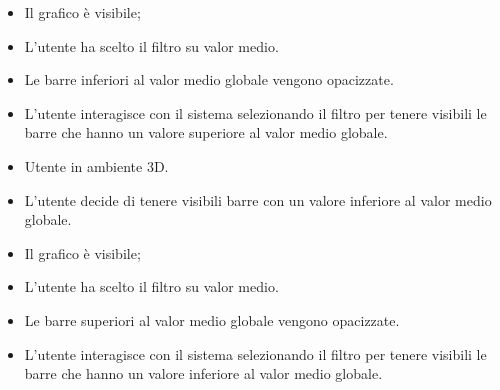 { %
    \begin{itemize}
        \item Il grafico è visibile;
        \item L'utente ha scelto il filtro su valor medio.
    \end{itemize}
}
{ %
    \begin{itemize}
        \item Le barre inferiori al valor medio globale vengono opacizzate.
    \end{itemize}
}
{ %
    \begin{itemize}
        \item L'utente interagisce con il sistema selezionando il filtro per tenere visibili le barre che hanno un valore superiore al valor medio globale.
    \end{itemize}
}
\UCdsc
{ %
    \begin{itemize}
        \item Utente in ambiente 3D.
    \end{itemize}
}
{ %
    \begin{itemize}
        \item L'utente decide di tenere visibili barre con un valore inferiore al valor medio globale.
    \end{itemize}
}
{ %
    \begin{itemize}
        \item Il grafico è visibile;
        \item L'utente ha scelto il filtro su valor medio.
    \end{itemize}
}
{ %
    \begin{itemize}
        \item Le barre superiori al valor medio globale vengono opacizzate.
    \end{itemize}
}
{ %
    \begin{itemize}
        \item L'utente interagisce con il sistema selezionando il filtro per tenere visibili le barre che hanno un valore inferiore al valor medio globale.
    \end{itemize}
}


